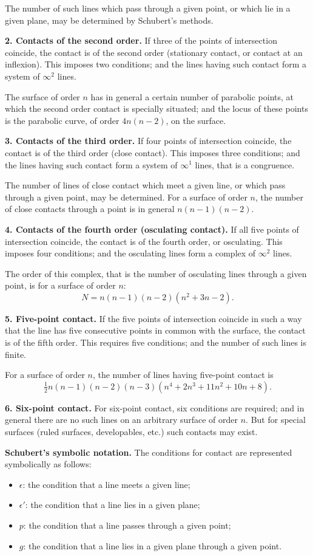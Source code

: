 \documentclass[11pt,a4paper]{book}
\begin{document}
The number of such lines which pass through a given point, or which lie
in a given plane, may be determined by Schubert's methods.

\textbf{2. Contacts of the second order.} If three of the points of intersection
coincide, the contact is of the second order (stationary contact, or contact
at an inflexion). This imposes two conditions; and the lines having such
contact form a system of $\infty^2$ lines.

The surface of order $n$ has in general a certain number of parabolic points,
at which the second order contact is specially situated; and the locus of
these points is the parabolic curve, of order $4n(n-2)$, on the surface.

\textbf{3. Contacts of the third order.} If four points of intersection coincide,
the contact is of the third order (close contact). This imposes three
conditions; and the lines having such contact form a system of $\infty^1$ lines,
that is a congruence.

The number of lines of close contact which meet a given line, or which
pass through a given point, may be determined. For a surface of order $n$,
the number of close contacts through a point is in general $n(n-1)(n-2)$.

\textbf{4. Contacts of the fourth order (osculating contact).} If all five points of
intersection coincide, the contact is of the fourth order, or osculating. This
imposes four conditions; and the osculating lines form a complex of
$\infty^2$ lines.

The order of this complex, that is the number of osculating lines through
a given point, is for a surface of order $n$:
%
\[
N = n(n-1)(n-2)(n^2 + 3n - 2).
\]

\textbf{5. Five-point contact.} If the five points of intersection coincide in such a
way that the line has five consecutive points in common with the surface,
the contact is of the fifth order. This requires five conditions; and the
number of such lines is finite.

For a surface of order $n$, the number of lines having five-point contact is
%
\[
\tfrac{1}{2} n(n-1)(n-2)(n-3)(n^4 + 2n^3 + 11n^2 + 10n + 8).
\]

\textbf{6. Six-point contact.} For six-point contact, six conditions are required;
and in general there are no such lines on an arbitrary surface of order $n$.
But for special surfaces (ruled surfaces, developables, etc.) such contacts
may exist.

\textbf{Schubert's symbolic notation.} The conditions for contact are represented
symbolically as follows:
\begin{itemize}
\item $\epsilon$: the condition that a line meets a given line;
\item $\epsilon'$: the condition that a line lies in a given plane;
\item $p$: the condition that a line passes through a given point;
\item $g$: the condition that a line lies in a given plane through a given point.
\end{itemize}
\end{document}
